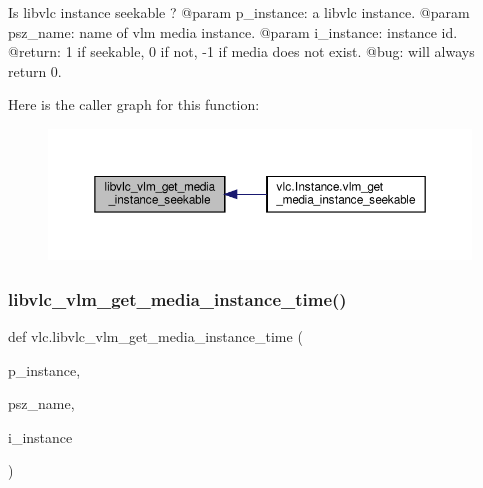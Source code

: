 \begin{DoxyVerb}Is libvlc instance seekable ?
@param p_instance: a libvlc instance.
@param psz_name: name of vlm media instance.
@param i_instance: instance id.
@return: 1 if seekable, 0 if not, -1 if media does not exist.
@bug: will always return 0.
\end{DoxyVerb}
 Here is the caller graph for this function\+:
\nopagebreak
\begin{figure}[H]
\begin{center}
\leavevmode
\includegraphics[width=350pt]{namespacevlc_aeb4b8ac59f98ba964d1963665404ee8d_icgraph}
\end{center}
\end{figure}
\mbox{\label{namespacevlc_a7cc16a54030b527e482741447ba35aef}} 
\subsubsection{\texorpdfstring{libvlc\+\_\+vlm\+\_\+get\+\_\+media\+\_\+instance\+\_\+time()}{libvlc\_vlm\_get\_media\_instance\_time()}}
{\footnotesize\ttfamily def vlc.\+libvlc\+\_\+vlm\+\_\+get\+\_\+media\+\_\+instance\+\_\+time (\begin{DoxyParamCaption}\item[{}]{p\+\_\+instance,  }\item[{}]{psz\+\_\+name,  }\item[{}]{i\+\_\+instance }\end{DoxyParamCaption})}

